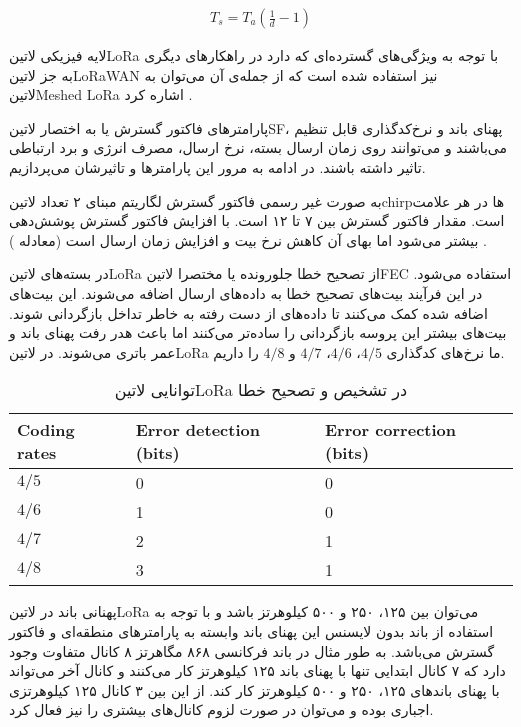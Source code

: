 \begin{align}
  \label{معادله: چرخه وظیفه}
  T_{s} = T_{a}\left( \frac{1}{d} - 1 \right)
\end{align}

لایه فیزیکی ‌لاتین{LoRa} با توجه به ویژگی‌های گسترده‌ای که دارد در راهکارهای دیگری به جز ‌لاتین{LoRaWAN} نیز استفاده شده است که از جمله‌ی آن می‌توان به ‌لاتین{Meshed LoRa} اشاره کرد
.

پارامترهای فاکتور گسترش یا به اختصار ‌لاتین{SF}، پهنای باند و نرخ‌کدگذاری قابل تنظیم می‌باشند و می‌توانند روی زمان ارسال بسته، نرخ ارسال، مصرف انرژی و برد ارتباطی تاثیر داشته باشند.
در ادامه به مرور این پارامترها و تاثیرشان می‌پردازیم.

به صورت غیر رسمی فاکتور گسترش لگاریتم مبنای ۲ تعداد ‌لاتین{chirp}ها در هر علامت است. مقدار فاکتور گسترش بین ۷ تا ۱۲ است.
با افزایش فاکتور گسترش پوشش‌دهی بیشتر می‌شود اما بهای آن کاهش نرخ بیت و افزایش زمان ارسال است (معادله )
.

در بسته‌های ‌لاتین{LoRa} از تصحیح خطا جلورونده یا مختصرا ‌لاتین{FEC} استفاده می‌شود.
در این فرآیند بیت‌های تصحیح خطا به داده‌های ارسال اضافه می‌شوند.
این بیت‌های اضافه شده کمک می‌کنند تا داده‌های از دست رفته به خاطر تداخل بازگردانی شوند.
بیت‌های بیشتر این پروسه بازگردانی را ساده‌تر می‌کنند اما باعث هدر رفت پهنای باند و عمر باتری می‌شوند.
در ‌لاتین{LoRa} ما نرخ‌های کدگذاری $4/5$، $4/6$، $4/7$ و $4/8$ را داریم.

\begin{table}
\caption{توانایی ‌لاتین{LoRa} در تشخیص و تصحیح خطا }
\begin{latin}\begin{tabularx}
  {\textwidth}
  {|*{3}{X|}}
  \toprule
  Coding rates &
  Error detection (bits) &
  Error correction (bits) \\
  \midrule
  $4/5$ &
  0 &
  0 \\
  \midrule
  $4/6$ &
  1 &
  0 \\
  \midrule
  $4/7$ &
  2 &
  1 \\
  \midrule
  $4/8$ &
  3 &
  1 \\
  \bottomrule
\end{tabularx}\end{latin}
\end{table}

پهنانی باند در ‌لاتین{LoRa} می‌توان بین ۱۲۵، ۲۵۰ و ۵۰۰ کیلوهرتز باشد و با توجه به استفاده از باند بدون لایسنس این پهنای باند وابسته به پارامتر‌های منطقه‌ای و فاکتور گسترش می‌باشد.
به طور مثال در باند فرکانسی ۸۶۸ مگاهرتز ۸ کانال متفاوت وجود دارد که ۷ کانال ابتدایی تنها با پهنای باند ۱۲۵ کیلوهرتز کار می‌کنند و کانال آخر می‌تواند با پهنای باند‌های
۱۲۵، ۲۵۰ و ۵۰۰ کیلوهرتز کار کند. از این بین ۳ کانال ۱۲۵ کیلوهرتزی اجباری بوده و می‌توان در صورت لزوم کانال‌های بیشتری را نیز فعال کرد.

